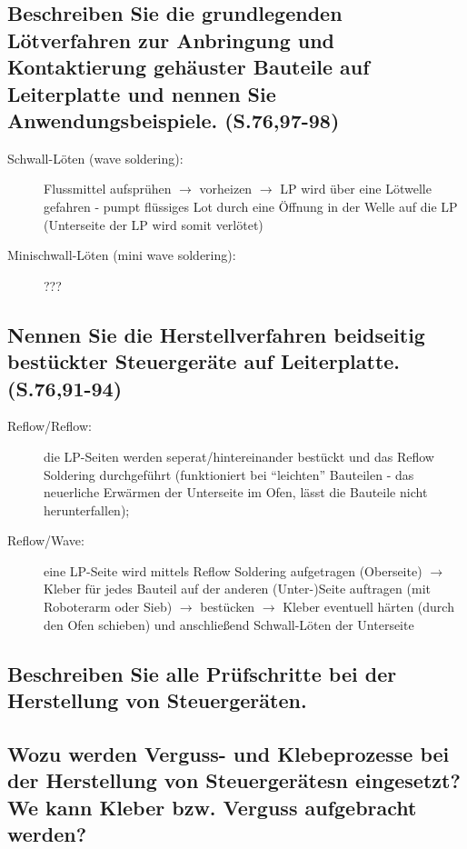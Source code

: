 \subsection{Beschreiben Sie die grundlegenden Lötverfahren zur Anbringung und Kontaktierung gehäuster Bauteile auf Leiterplatte und nennen Sie Anwendungsbeispiele. (S.76,97-98)}
\begin{description}
\item[Schwall-Löten (wave soldering):] Flussmittel aufsprühen $\rightarrow$ vorheizen $\rightarrow$ 
  LP wird über eine Lötwelle gefahren - pumpt flüssiges Lot durch eine Öffnung in der Welle auf die 
  LP (Unterseite der LP wird somit verlötet)
\item[Minischwall-Löten (mini wave soldering):] ???
\end{description}

\subsection{Nennen Sie die Herstellverfahren beidseitig bestückter Steuergeräte auf Leiterplatte. (S.76,91-94)}
\begin{description}
\item[Reflow/Reflow:] die LP-Seiten werden seperat/hintereinander bestückt und das Reflow Soldering 
  durchgeführt (funktioniert bei ``leichten'' Bauteilen - das neuerliche Erwärmen der Unterseite im 
  Ofen, lässt die Bauteile nicht herunterfallen);
\item[Reflow/Wave:] eine LP-Seite wird mittels Reflow Soldering aufgetragen (Oberseite) 
  $\rightarrow$ Kleber für jedes Bauteil auf der anderen (Unter-)Seite auftragen (mit Roboterarm 
  oder Sieb) $\rightarrow$ bestücken $\rightarrow$ Kleber eventuell härten (durch den Ofen schieben) 
  und anschließend Schwall-Löten der Unterseite
\end{description}

\subsection{Beschreiben Sie alle Prüfschritte bei der Herstellung von Steuergeräten.}

\subsection{Wozu werden Verguss- und Klebeprozesse bei der Herstellung von Steuergerätesn eingesetzt? We kann Kleber bzw. Verguss aufgebracht werden?}

